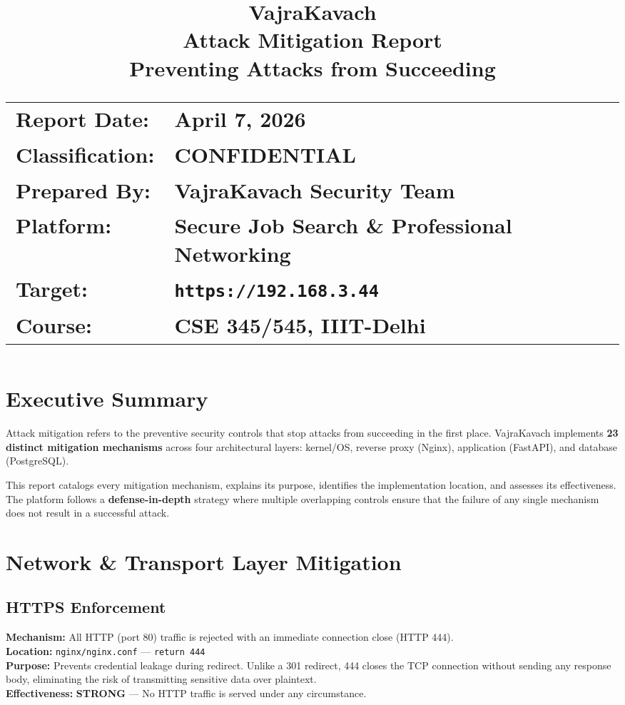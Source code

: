 \documentclass[11pt,a4paper]{article}
\title{
  \vspace{-1cm}
  \textbf{\Huge VajraKavach}\\[0.3cm]
  \textbf{\Large Attack Mitigation Report}\\[0.3cm]
  \large Preventing Attacks from Succeeding\\[0.8cm]
  \normalsize
  \begin{tabular}{ll}
    \textbf{Report Date:} & April 7, 2026 \\
    \textbf{Classification:} & CONFIDENTIAL \\
    \textbf{Prepared By:} & VajraKavach Security Team \\
    \textbf{Platform:} & Secure Job Search \& Professional Networking \\
    \textbf{Target:} & \texttt{https://192.168.3.44} \\
    \textbf{Course:} & CSE 345/545, IIIT-Delhi \\
  \end{tabular}
}
\author{}
\date{}
\begin{document}
\maketitle
\thispagestyle{fancy}

\newpage
\tableofcontents
\newpage

\section{Executive Summary}

Attack mitigation refers to the preventive security controls that stop attacks from succeeding in the first place. VajraKavach implements \textbf{23 distinct mitigation mechanisms} across four architectural layers: kernel/OS, reverse proxy (Nginx), application (FastAPI), and database (PostgreSQL).

This report catalogs every mitigation mechanism, explains its purpose, identifies the implementation location, and assesses its effectiveness. The platform follows a \textbf{defense-in-depth} strategy where multiple overlapping controls ensure that the failure of any single mechanism does not result in a successful attack.

\section{Network \& Transport Layer Mitigation}

\subsection{HTTPS Enforcement}

\begin{tcolorbox}[colback=shieldgreen!5, colframe=shieldgreen]
\textbf{Mechanism:} All HTTP (port 80) traffic is rejected with an immediate connection close (HTTP 444).\\
\textbf{Location:} \texttt{nginx/nginx.conf} — \texttt{return 444}\\
\textbf{Purpose:} Prevents credential leakage during redirect. Unlike a 301 redirect, 444 closes the TCP connection without sending any response body, eliminating the risk of transmitting sensitive data over plaintext.\\
\textbf{Effectiveness:} \textcolor{shieldgreen}{\textbf{STRONG}} — No HTTP traffic is served under any circumstance.
\end{tcolorbox}
\end{document}
